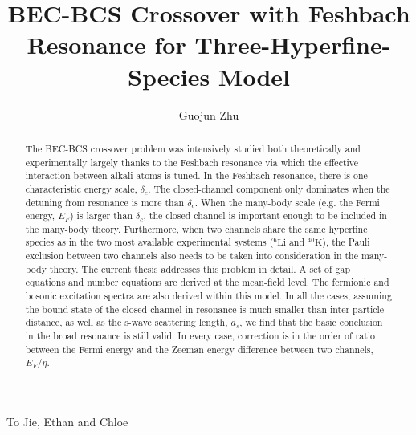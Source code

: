 \documentclass[edeposit,fullpage,prequest,10pt]{uiucthesis2009}
\begin{document}
\title{BEC-BCS Crossover with Feshbach Resonance for Three-Hyperfine-Species Model}
\author{Guojun Zhu}
\phdthesis
{}
\maketitle

\frontmatter

%
\begin{abstract}
The BEC-BCS crossover problem was intensively studied both theoretically and experimentally largely thanks to the Feshbach resonance via which the effective interaction between alkali atoms is tuned.  In the Feshbach resonance, there is one characteristic energy scale, $\delta_c$. The closed-channel component only dominates when the detuning from resonance is more than $\delta_c$.  When the many-body scale (e.g. the Fermi energy, $E_{F}$) is larger than $\delta_c$, the closed channel is important enough to be included in the many-body theory.  Furthermore, when two channels share the same hyperfine species as in the two most available experimental systems (${}^6\text{Li}$ and ${}^{40}\text{K}$), the Pauli exclusion between two channels also needs to be taken into consideration in the many-body theory.  The current  thesis addresses this problem in detail. A set of gap equations and number equations  are derived at the mean-field level.  The fermionic and bosonic excitation spectra are also derived within this model.  In all the cases, assuming the bound-state of the closed-channel in resonance is much smaller than inter-particle distance, as well as the s-wave scattering length, $a_s$, we find that  the basic conclusion in the broad resonance is still valid. In every case, correction is  in the  order of ratio between the Fermi energy and the Zeeman energy difference between two channels, $E_F/\eta$.  
\end{abstract}

\begin{dedication}
To Jie, Ethan and Chloe
\end{dedication}
\end{document}
